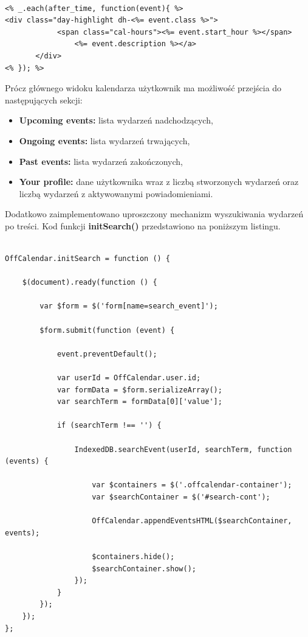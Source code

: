 \begin{lstlisting}[caption=Fragment kodu prezentujący składnię Underscore.js., label=amb, captionpos=b]

<% _.each(after_time, function(event){ %>
<div class="day-highlight dh-<%= event.class %>">
       		<span class="cal-hours"><%= event.start_hour %></span>
              	<%= event.description %></a>
       </div>
<% }); %>

\end{lstlisting}

Prócz głównego widoku kalendarza użytkownik ma możliwość przejścia do następujących sekcji:

\begin{itemize}
\item \textbf{Upcoming events:} lista wydarzeń nadchodzących,
\item \textbf{Ongoing events:} lista wydarzeń trwających,
\item \textbf{Past events:} lista wydarzeń zakończonych,
\item \textbf{Your profile:} dane użytkownika wraz z liczbą stworzonych wydarzeń oraz liczbą wydarzeń z aktywowanymi powiadomieniami.
\end{itemize}

Dodatkowo zaimplementowano uproszczony mechanizm wyszukiwania wydarzeń po treści. Kod funkcji \textbf{initSearch()} przedstawiono na poniższym listingu.

\begin{lstlisting}[caption=Wyszukiwanie wydarzeń w oparciu o treść., label=amb, captionpos=b]

OffCalendar.initSearch = function () {

    $(document).ready(function () {
    
        var $form = $('form[name=search_event]');

        $form.submit(function (event) {

            event.preventDefault();

            var userId = OffCalendar.user.id;
            var formData = $form.serializeArray();
            var searchTerm = formData[0]['value'];

            if (searchTerm !== '') {

                IndexedDB.searchEvent(userId, searchTerm, function (events) {

                    var $containers = $('.offcalendar-container');
                    var $searchContainer = $('#search-cont');

                    OffCalendar.appendEventsHTML($searchContainer, events);

                    $containers.hide();
                    $searchContainer.show();
                });
            }
        });
    });
};

\end{lstlisting}

